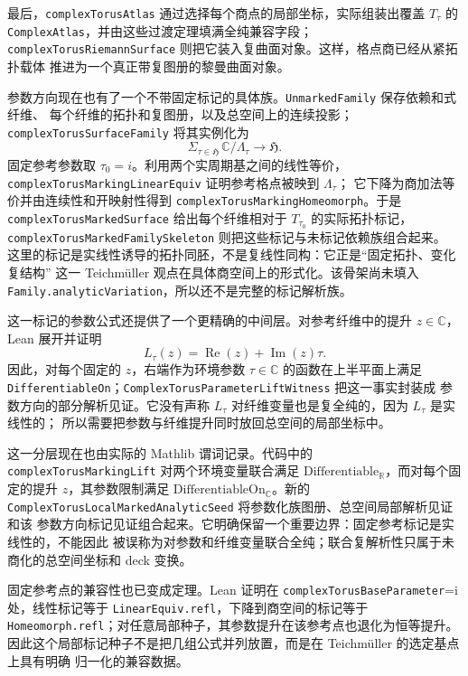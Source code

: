 \documentclass[UTF8,fontset=none,a4paper,11pt]{ctexart}
\begin{document}
最后，\texttt{complexTorusAtlas} 通过选择每个商点的局部坐标，实际组装出覆盖
\(T_\tau\) 的 \texttt{ComplexAtlas}，并由这些过渡定理填满全纯兼容字段；
\texttt{complexTorusRiemannSurface} 则把它装入复曲面对象。这样，格点商已经从紧拓扑载体
推进为一个真正带复图册的黎曼曲面对象。

参数方向现在也有了一个不带固定标记的具体族。\texttt{UnmarkedFamily} 保存依赖和式纤维、
每个纤维的拓扑和复图册，以及总空间上的连续投影；\texttt{complexTorusSurfaceFamily}
将其实例化为
\[
  \Sigma_{\tau\in\mathfrak H}\,\mathbb C/\Lambda_\tau\longrightarrow\mathfrak H.
\]
固定参考参数取 \(\tau_0=i\)。利用两个实周期基之间的线性等价，
\texttt{complexTorusMarking\allowbreak LinearEquiv} 证明参考格点被映到 \(\Lambda_\tau\)；
它下降为商加法等价并由连续性和开映射性得到
\texttt{complexTorusMarking\allowbreak Homeomorph}。于是
\texttt{complexTorusMarked\allowbreak Surface} 给出每个纤维相对于
\(T_{\tau_0}\) 的实际拓扑标记，\texttt{complexTorusMarked\allowbreak Family\allowbreak Skeleton}
则把这些标记与未标记依赖族组合起来。
这里的标记是实线性诱导的拓扑同胚，不是复线性同构：它正是“固定拓扑、变化复结构”
这一 Teichmüller 观点在具体商空间上的形式化。该骨架尚未填入
\texttt{Family.analyticVariation}，所以还不是完整的标记解析族。

这一标记的参数公式还提供了一个更精确的中间层。对参考纤维中的提升
\(z\in\mathbb C\)，Lean 展开并证明
\[
  L_\tau(z)=\operatorname{Re}(z)+\operatorname{Im}(z)\tau .
\]
因此，对每个固定的 \(z\)，右端作为环境参数 \(\tau\in\mathbb C\) 的函数在上半平面上满足
\texttt{DifferentiableOn}；\texttt{ComplexTorusParameterLiftWitness} 把这一事实封装成
参数方向的部分解析见证。它没有声称 \(L_\tau\) 对纤维变量也是复全纯的，因为 \(L_\tau\) 是实线性的；
所以需要把参数与纤维提升同时放回总空间的局部坐标中。

这一分层现在也由实际的 Mathlib 谓词记录。代码中的
\texttt{complexTorusMarkingLift} 对两个环境变量联合满足
\(\mathrm{Differentiable}_{\mathbb R}\)，而对每个固定的提升 \(z\)，其参数限制满足
\(\mathrm{DifferentiableOn}_{\mathbb C}\)。新的
\texttt{ComplexTorusLocalMarkedAnalyticSeed} 将参数化族图册、总空间局部解析见证和该
参数方向标记见证组合起来。它明确保留一个重要边界：固定参考标记是实线性的，不能因此
被误称为对参数和纤维变量联合全纯；联合复解析性只属于未商化的总空间坐标和 deck 变换。

固定参考点的兼容性也已变成定理。Lean 证明在
\texttt{complexTorusBaseParameter}=i 处，线性标记等于
\texttt{LinearEquiv.refl}，下降到商空间的标记等于
\texttt{Homeomorph.refl}；对任意局部种子，其参数提升在该参考点也退化为恒等提升。
因此这个局部标记种子不是把几组公式并列放置，而是在 Teichmüller 的选定基点上具有明确
归一化的兼容数据。
\end{document}

